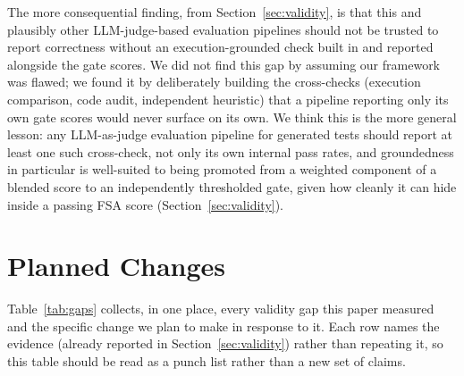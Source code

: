 \documentclass[conference]{IEEEtran}
\begin{document}
The more consequential finding, from Section~\ref{sec:validity}, is that this
and plausibly other LLM-judge-based evaluation pipelines should not be
trusted to report correctness without an execution-grounded check built in
and reported alongside the gate scores. We did not find this gap by assuming
our framework was flawed; we found it by deliberately building the
cross-checks (execution comparison, code audit, independent heuristic) that a
pipeline reporting only its own gate scores would never surface on its own.
We think this is the more general lesson: any LLM-as-judge evaluation
pipeline for generated tests should report at least one such cross-check, not
only its own internal pass rates, and groundedness in particular is
well-suited to being promoted from a weighted component of a blended score to
an independently thresholded gate, given how cleanly it can hide inside a
passing FSA score (Section~\ref{sec:validity}).

\section{Planned Changes}
\label{sec:future}

Table~\ref{tab:gaps} collects, in one place, every validity gap this paper
measured and the specific change we plan to make in response to it. Each row
names the evidence (already reported in Section~\ref{sec:validity}) rather
than repeating it, so this table should be read as a punch list rather than a
new set of claims.
\end{document}

